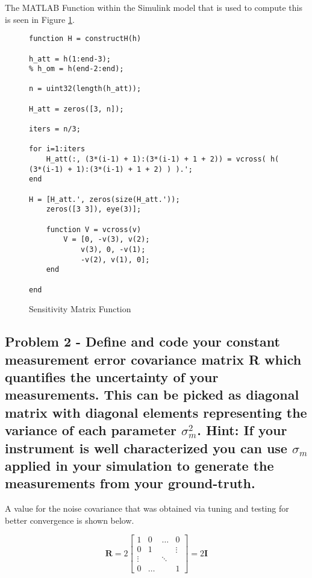 The MATLAB Function within the Simulink model that is used to compute this is seen in Figure \ref{fig:sens_matrix_function}.

\begin{figure} [H]
    \centering
    \captionsetup{ justification = centering }
    \begin{lstlisting}
function H = constructH(h)

h_att = h(1:end-3);
% h_om = h(end-2:end);

n = uint32(length(h_att));

H_att = zeros([3, n]);

iters = n/3;

for i=1:iters
    H_att(:, (3*(i-1) + 1):(3*(i-1) + 1 + 2)) = vcross( h( (3*(i-1) + 1):(3*(i-1) + 1 + 2) ) ).';
end

H = [H_att.', zeros(size(H_att.'));
    zeros([3 3]), eye(3)];

    function V = vcross(v)
        V = [0, -v(3), v(2);
            v(3), 0, -v(1);
            -v(2), v(1), 0];
    end

end
    \end{lstlisting}
    \caption{Sensitivity Matrix Function}
    \label{fig:sens_matrix_function}
\end{figure}

\subsection{Problem 2 - Define and code your constant measurement error covariance matrix R which quantifies the uncertainty of your measurements. This can be picked as diagonal matrix with diagonal elements representing the variance of each parameter $\sigma^2_m$. Hint: If your instrument is well characterized you can use $\sigma_m$ applied in your simulation to generate the measurements from your ground-truth.}

A value for the noise covariance that was obtained via tuning and testing for better convergence is shown below.

\begin{equation*}
    \boldsymbol{R} = 2 \begin{bmatrix}
        1 & 0 & \dots & 0 \\
        0 & 1 &  & \vdots \\
        \vdots &  &  \ddots & \\
        0 & \dots & & 1
    \end{bmatrix} = 2 \boldsymbol{I}
\end{equation*}

